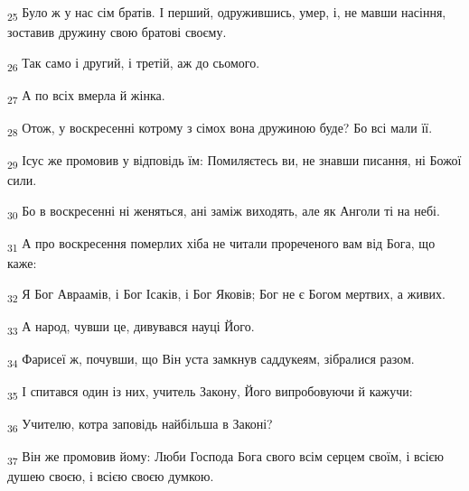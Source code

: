 \begin{tcolorbox}
\textsubscript{25} Було ж у нас сім братів. І перший, одружившись, умер, і, не мавши насіння, зоставив дружину свою братові своєму.
\end{tcolorbox}
\begin{tcolorbox}
\textsubscript{26} Так само і другий, і третій, аж до сьомого.
\end{tcolorbox}
\begin{tcolorbox}
\textsubscript{27} А по всіх вмерла й жінка.
\end{tcolorbox}
\begin{tcolorbox}
\textsubscript{28} Отож, у воскресенні котрому з сімох вона дружиною буде? Бо всі мали її.
\end{tcolorbox}
\begin{tcolorbox}
\textsubscript{29} Ісус же промовив у відповідь їм: Помиляєтесь ви, не знавши писання, ні Божої сили.
\end{tcolorbox}
\begin{tcolorbox}
\textsubscript{30} Бо в воскресенні ні женяться, ані заміж виходять, але як Анголи ті на небі.
\end{tcolorbox}
\begin{tcolorbox}
\textsubscript{31} А про воскресення померлих хіба не читали прореченого вам від Бога, що каже:
\end{tcolorbox}
\begin{tcolorbox}
\textsubscript{32} Я Бог Авраамів, і Бог Ісаків, і Бог Яковів; Бог не є Богом мертвих, а живих.
\end{tcolorbox}
\begin{tcolorbox}
\textsubscript{33} А народ, чувши це, дивувався науці Його.
\end{tcolorbox}
\begin{tcolorbox}
\textsubscript{34} Фарисеї ж, почувши, що Він уста замкнув саддукеям, зібралися разом.
\end{tcolorbox}
\begin{tcolorbox}
\textsubscript{35} І спитався один із них, учитель Закону, Його випробовуючи й кажучи:
\end{tcolorbox}
\begin{tcolorbox}
\textsubscript{36} Учителю, котра заповідь найбільша в Законі?
\end{tcolorbox}
\begin{tcolorbox}
\textsubscript{37} Він же промовив йому: Люби Господа Бога свого всім серцем своїм, і всією душею своєю, і всією своєю думкою.
\end{tcolorbox}
